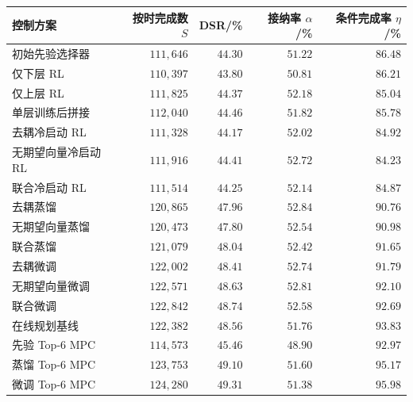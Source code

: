 \begin{table}[!htbp]
\centering
{}
\label{tab:ch5-dynamic-main}
\begin{tabular}{lrrrr}
\toprule
控制方案 & 按时完成数 $S$ & DSR/\% & 接纳率 $\alpha$/\% & 条件完成率 $\eta$/\% \\
\midrule
初始先验选择器 & $111,646$ & $44.30$ & $51.22$ & $86.48$ \\
仅下层 RL & $110,397$ & $43.80$ & $50.81$ & $86.21$ \\
仅上层 RL & $111,825$ & $44.37$ & $52.18$ & $85.04$ \\
单层训练后拼接 & $112,040$ & $44.46$ & $51.82$ & $85.78$ \\
去耦冷启动 RL & $111,328$ & $44.17$ & $52.02$ & $84.92$ \\
无期望向量冷启动 RL & $111,916$ & $44.41$ & $52.72$ & $84.23$ \\
联合冷启动 RL & $111,514$ & $44.25$ & $52.14$ & $84.87$ \\
去耦蒸馏 & $120,865$ & $47.96$ & $52.84$ & $90.76$ \\
无期望向量蒸馏 & $120,473$ & $47.80$ & $52.54$ & $90.98$ \\
联合蒸馏 & $121,079$ & $48.04$ & $52.42$ & $91.65$ \\
去耦微调 & $122,002$ & $48.41$ & $52.74$ & $91.79$ \\
无期望向量微调 & $122,571$ & $48.63$ & $52.81$ & $92.10$ \\
联合微调 & $122,842$ & $48.74$ & $52.58$ & $92.69$ \\
在线规划基线 & $122,382$ & $48.56$ & $51.76$ & $93.83$ \\
先验 Top-6 MPC & $114,573$ & $45.46$ & $48.90$ & $92.97$ \\
蒸馏 Top-6 MPC & $123,753$ & $49.10$ & $51.60$ & $95.17$ \\
微调 Top-6 MPC & $124,280$ & $49.31$ & $51.38$ & $95.98$ \\
\bottomrule
\end{tabular}
\end{table}
